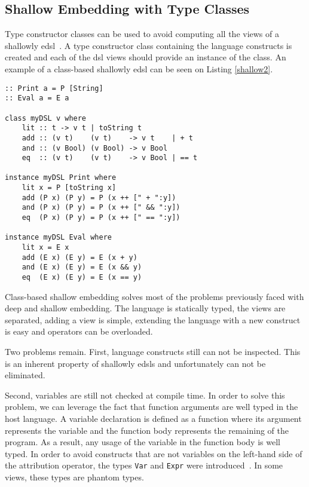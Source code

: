 \subsection{Shallow Embedding with Type Classes}\label{sec:class_based_edsl}

Type constructor classes can be used to avoid computing all the views of a shallowly \ac{edsl}~\cite{tagless}. A type constructor class containing the language constructs is created and each of the \ac{dsl} views should provide an instance of the class. An example of a class-based shallowly \ac{edsl} can be seen on Listing \ref{shallow2}.

\begin{lstlisting}[caption=A simple class-based shallowly \ac{edsl},captionpos=b,label=shallow2]
:: Print a = P [String]
:: Eval a = E a

class myDSL v where
    lit :: t -> v t | toString t
    add :: (v t)    (v t)    -> v t    | + t
    and :: (v Bool) (v Bool) -> v Bool
    eq  :: (v t)    (v t)    -> v Bool | == t
    
instance myDSL Print where
    lit x = P [toString x]
    add (P x) (P y) = P (x ++ [" + ":y])
    and (P x) (P y) = P (x ++ [" && ":y])
    eq  (P x) (P y) = P (x ++ [" == ":y])
    
instance myDSL Eval where
    lit x = E x
    add (E x) (E y) = E (x + y)
    and (E x) (E y) = E (x && y)
    eq  (E x) (E y) = E (x == y)
\end{lstlisting}

Class-based shallow embedding solves most of the problems previously faced with deep and shallow embedding. The language is statically typed, the views are separated, adding a view is simple, extending the language with a new construct is easy and operators can be overloaded. 

Two problems remain. First, language constructs still can not be inspected. This is an inherent property of shallowly \acp{edsl} and unfortunately can not be eliminated. 

Second, variables are still not checked at compile time. In order to solve this problem, we can leverage the fact that function arguments are well typed in the host language. A variable declaration is defined as a function where its argument represents the variable and the function body represents the remaining of the program. As a result, any usage of the variable in the function body is well typed. In order to avoid constructs that are not variables on the left-hand side of the attribution operator, the types \texttt{Var} and \texttt{Expr} were introduced~\cite{mtasks}. In some views, these types are phantom types. 

